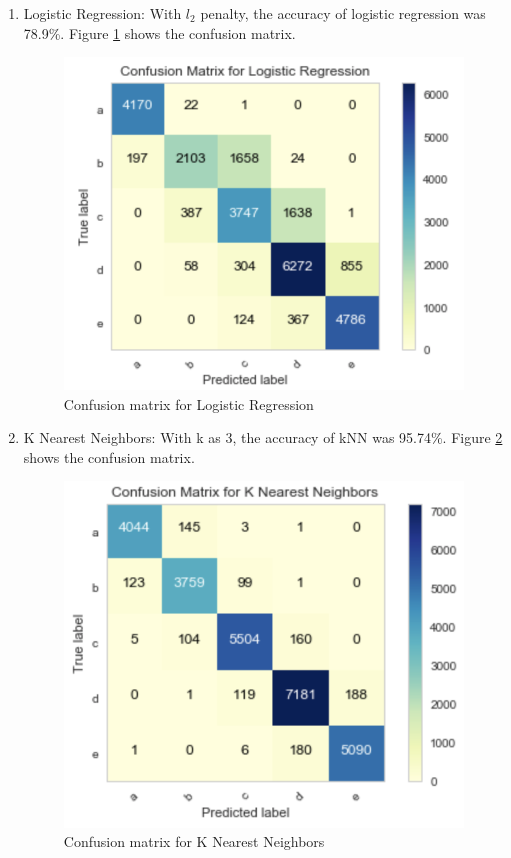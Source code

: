 \documentclass[sigconf]{acmart}
\begin{document}
\begin{enumerate}
  \item Logistic Regression: With $l_2$ penalty, the accuracy of logistic regression was 78.9\%. Figure \ref{fig:Fig4} shows the confusion matrix. \\

\begin{figure}
\includegraphics[width=1.0\columnwidth]{images/fig4.png}
\caption{Confusion matrix for Logistic Regression \cite{code-base}}
\label{fig:Fig4}
\end{figure}

  \item K Nearest Neighbors: With k as 3, the accuracy of kNN was 95.74\%. Figure \ref{fig:Fig5} shows the confusion matrix. \\

\begin{figure}
\includegraphics[width=1.0\columnwidth]{images/fig5.png}
\caption{Confusion matrix for K Nearest Neighbors \cite{code-base}}
\label{fig:Fig5}
\end{figure}


\end{enumerate}
\end{document}

